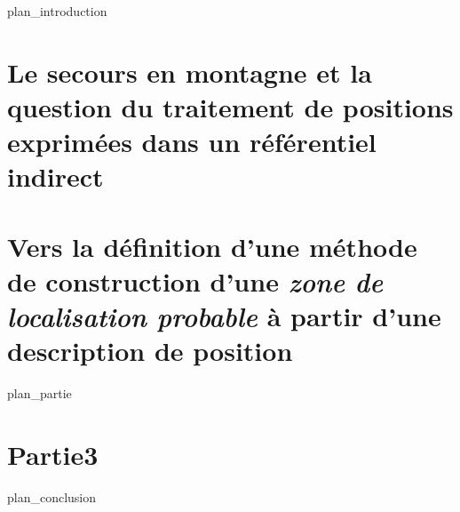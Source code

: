 \label{part:int}
{plan_introduction}
\part{Le secours en montagne et la question du traitement de positions exprimées dans un référentiel indirect}
\label{part:01}
\part{Vers la définition d'une méthode de construction d'une
  \emph{zone de localisation probable} à partir d'une description de
  position}
\label{part:02}
{plan_partie}
\part{Partie3}
\label{part:03}
\label{part:cnl}
{plan_conclusion}

